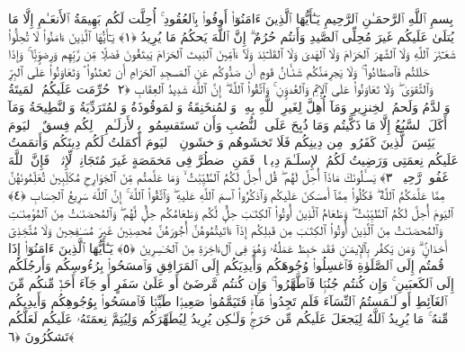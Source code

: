 
  
    
  
    
    

\nopagebreak
  بِسمِ ٱللَّهِ ٱلرَّحمَـٰنِ ٱلرَّحِيمِ
  يَـٰٓأَيُّهَا ٱلَّذِينَ ءَامَنُوٓا۟ أَوفُوا۟ بِٱلعُقُودِ ۚ أُحِلَّت لَكُم بَهِيمَةُ ٱلأَنعَـٰمِ إِلَّا مَا يُتلَىٰ عَلَيكُم غَيرَ مُحِلِّى ٱلصَّيدِ وَأَنتُم حُرُمٌ ۗ إِنَّ ٱللَّهَ يَحكُمُ مَا يُرِيدُ ﴿١﴾
 يَـٰٓأَيُّهَا ٱلَّذِينَ ءَامَنُوا۟ لَا تُحِلُّوا۟ شَعَـٰٓئِرَ ٱللَّهِ وَلَا ٱلشَّهرَ ٱلحَرَامَ وَلَا ٱلهَدىَ وَلَا ٱلقَلَـٰٓئِدَ وَلَآ ءَآمِّينَ ٱلبَيتَ ٱلحَرَامَ يَبتَغُونَ فَضلًۭا مِّن رَّبِّهِم وَرِضوَٟنًۭا ۚ وَإِذَا حَلَلتُم فَٱصطَادُوا۟ ۚ وَلَا يَجرِمَنَّكُم شَنَـَٔانُ قَومٍ أَن صَدُّوكُم عَنِ ٱلمَسجِدِ ٱلحَرَامِ أَن تَعتَدُوا۟ ۘ وَتَعَاوَنُوا۟ عَلَى ٱلبِرِّ وَٱلتَّقوَىٰ ۖ وَلَا تَعَاوَنُوا۟ عَلَى ٱلإِثمِ وَٱلعُدوَٟنِ ۚ وَٱتَّقُوا۟ ٱللَّهَ ۖ إِنَّ ٱللَّهَ شَدِيدُ ٱلعِقَابِ ﴿٢﴾
 حُرِّمَت عَلَيكُمُ ٱلمَيتَةُ وَٱلدَّمُ وَلَحمُ ٱلخِنزِيرِ وَمَآ أُهِلَّ لِغَيرِ ٱللَّهِ بِهِۦ وَٱلمُنخَنِقَةُ وَٱلمَوقُوذَةُ وَٱلمُتَرَدِّيَةُ وَٱلنَّطِيحَةُ وَمَآ أَكَلَ ٱلسَّبُعُ إِلَّا مَا ذَكَّيتُم وَمَا ذُبِحَ عَلَى ٱلنُّصُبِ وَأَن تَستَقسِمُوا۟ بِٱلأَزلَـٰمِ ۚ ذَٟلِكُم فِسقٌ ۗ ٱليَومَ يَئِسَ ٱلَّذِينَ كَفَرُوا۟ مِن دِينِكُم فَلَا تَخشَوهُم وَٱخشَونِ ۚ ٱليَومَ أَكمَلتُ لَكُم دِينَكُم وَأَتمَمتُ عَلَيكُم نِعمَتِى وَرَضِيتُ لَكُمُ ٱلإِسلَـٰمَ دِينًۭا ۚ فَمَنِ ٱضطُرَّ فِى مَخمَصَةٍ غَيرَ مُتَجَانِفٍۢ لِّإِثمٍۢ ۙ فَإِنَّ ٱللَّهَ غَفُورٌۭ رَّحِيمٌۭ ﴿٣﴾
 يَسـَٔلُونَكَ مَاذَآ أُحِلَّ لَهُم ۖ قُل أُحِلَّ لَكُمُ ٱلطَّيِّبَٰتُ ۙ وَمَا عَلَّمتُم مِّنَ ٱلجَوَارِحِ مُكَلِّبِينَ تُعَلِّمُونَهُنَّ مِمَّا عَلَّمَكُمُ ٱللَّهُ ۖ فَكُلُوا۟ مِمَّآ أَمسَكنَ عَلَيكُم وَٱذكُرُوا۟ ٱسمَ ٱللَّهِ عَلَيهِ ۖ وَٱتَّقُوا۟ ٱللَّهَ ۚ إِنَّ ٱللَّهَ سَرِيعُ ٱلحِسَابِ ﴿٤﴾
 ٱليَومَ أُحِلَّ لَكُمُ ٱلطَّيِّبَٰتُ ۖ وَطَعَامُ ٱلَّذِينَ أُوتُوا۟ ٱلكِتَـٰبَ حِلٌّۭ لَّكُم وَطَعَامُكُم حِلٌّۭ لَّهُم ۖ وَٱلمُحصَنَـٰتُ مِنَ ٱلمُؤمِنَـٰتِ وَٱلمُحصَنَـٰتُ مِنَ ٱلَّذِينَ أُوتُوا۟ ٱلكِتَـٰبَ مِن قَبلِكُم إِذَآ ءَاتَيتُمُوهُنَّ أُجُورَهُنَّ مُحصِنِينَ غَيرَ مُسَـٰفِحِينَ وَلَا مُتَّخِذِىٓ أَخدَانٍۢ ۗ وَمَن يَكفُر بِٱلإِيمَـٰنِ فَقَد حَبِطَ عَمَلُهُۥ وَهُوَ فِى ٱلءَاخِرَةِ مِنَ ٱلخَـٰسِرِينَ ﴿٥﴾
 يَـٰٓأَيُّهَا ٱلَّذِينَ ءَامَنُوٓا۟ إِذَا قُمتُم إِلَى ٱلصَّلَوٰةِ فَٱغسِلُوا۟ وُجُوهَكُم وَأَيدِيَكُم إِلَى ٱلمَرَافِقِ وَٱمسَحُوا۟ بِرُءُوسِكُم وَأَرجُلَكُم إِلَى ٱلكَعبَينِ ۚ وَإِن كُنتُم جُنُبًۭا فَٱطَّهَّرُوا۟ ۚ وَإِن كُنتُم مَّرضَىٰٓ أَو عَلَىٰ سَفَرٍ أَو جَآءَ أَحَدٌۭ مِّنكُم مِّنَ ٱلغَآئِطِ أَو لَـٰمَستُمُ ٱلنِّسَآءَ فَلَم تَجِدُوا۟ مَآءًۭ فَتَيَمَّمُوا۟ صَعِيدًۭا طَيِّبًۭا فَٱمسَحُوا۟ بِوُجُوهِكُم وَأَيدِيكُم مِّنهُ ۚ مَا يُرِيدُ ٱللَّهُ لِيَجعَلَ عَلَيكُم مِّن حَرَجٍۢ وَلَـٰكِن يُرِيدُ لِيُطَهِّرَكُم وَلِيُتِمَّ نِعمَتَهُۥ عَلَيكُم لَعَلَّكُم تَشكُرُونَ ﴿٦﴾

